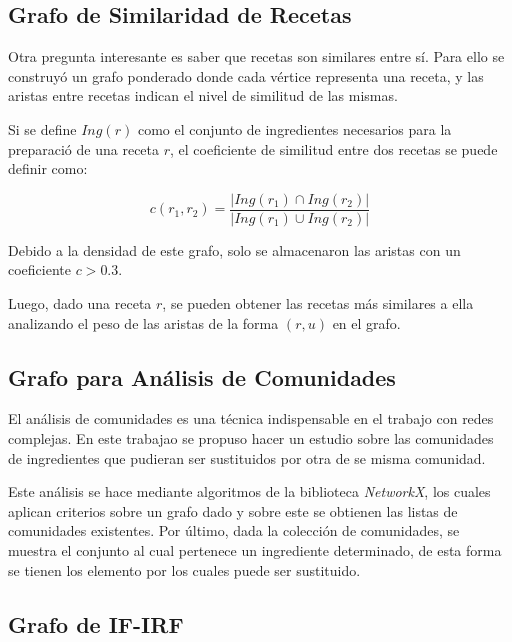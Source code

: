 \documentclass[a4paper]{article}
\begin{document}
\subsection{Grafo de Similaridad de Recetas}\label{sub:sim-rec-graph}

Otra pregunta interesante es saber que recetas son similares entre sí. Para
ello se construyó un grafo ponderado donde cada vértice representa una receta,
y las aristas entre recetas indican el nivel de similitud de las mismas.

Si se define $Ing(r)$ como el conjunto de ingredientes necesarios para la preparació
de una receta $r$, el coeficiente de similitud entre dos recetas se puede definir como:

$$ c(r_1, r_2) = \frac{|Ing(r_1) \cap Ing(r_2)|}{|Ing(r_1) \cup Ing(r_2)|}$$

Debido a la densidad de este grafo, solo se almacenaron las aristas con un 
coeficiente $c > 0.3$.

Luego, dado una receta $r$, se pueden obtener las recetas más similares a ella
analizando el peso de las aristas de la forma $(r, u)$ en el grafo.

\subsection{Grafo para Análisis de Comunidades}\label{sub:com-graph}

El análisis de comunidades es una técnica indispensable en el trabajo con
redes complejas. En este trabajao se propuso hacer un estudio sobre las
comunidades de ingredientes que pudieran ser sustituidos por otra de se misma
comunidad.

Este análisis se hace mediante algoritmos de la biblioteca \emph{NetworkX}, los
cuales aplican criterios sobre un grafo dado y sobre este se obtienen las listas
de comunidades existentes. Por último, dada la colección de comunidades, se
muestra el conjunto al cual pertenece un ingrediente determinado, de esta forma
se tienen los elemento por los cuales puede ser sustituido. 

\subsection{Grafo de IF-IRF}\label{sub:sim-graph}
\end{document}
